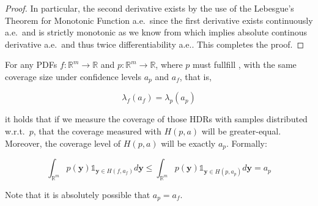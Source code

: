 \begin{proof}
    In particular, the second derivative exists by the use of the Lebesgue's Theorem for Monotonic Function a.e.\ since the first derivative exists continuously a.e.\ and is strictly monotonic as we know from  which implies absolute continous derivative a.e.\ and thus twice differentiability a.e.. This completes the proof.
\end{proof}

\begin{lemma}\label{lem:hdr_optimality_mll}
    For any PDFs $f: \mathbb{R}^m \to \mathbb{R}$ and $p: \mathbb{R}^m \to \mathbb{R}$, where $p$ must fullfill , with the same coverage size under confidence levels $a_p$ and $a_f$, that is,

    \begin{equation}
        \lambda_f(a_f) = \lambda_p(a_p)
    \end{equation}

    it holds that if we measure the coverage of those HDRs with samples distributed w.r.t.\ $p$, that the coverage measured with $H(p,a)$ will be greater-equal. Moreover, the coverage level of $H(p,a)$ will be exactly $a_p$. Formally:

    \begin{equation}
        \int_{\mathbb{R}^{m}} p(\mathbf{y}) \mathds1_{\mathbf{y} \in H(f, a_f)} d
        \mathbf{y} \leq \int_{\mathbb{R}^{m}} p(\mathbf{y})
        \mathds1_{\mathbf{y} \in
            H(p, a_p)} d \mathbf{y} = a_p
    \end{equation}
\end{lemma}
Note that it is absolutely possible that $a_p = a_f$.
